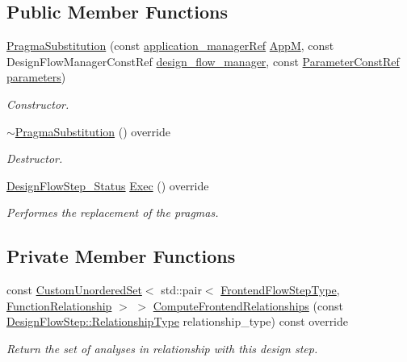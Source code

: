 \subsection*{Public Member Functions}
\begin{DoxyCompactItemize}
\item 
\hyperlink{classPragmaSubstitution_a6467e7276ca82574dfa5470900301f2d}{Pragma\+Substitution} (const \hyperlink{application__manager_8hpp_a04ccad4e5ee401e8934306672082c180}{application\+\_\+manager\+Ref} \hyperlink{classFrontendFlowStep_a0ac0d8db2a378416583f51c4faa59d15}{AppM}, const Design\+Flow\+Manager\+Const\+Ref \hyperlink{classDesignFlowStep_ab770677ddf087613add30024e16a5554}{design\+\_\+flow\+\_\+manager}, const \hyperlink{Parameter_8hpp_a37841774a6fcb479b597fdf8955eb4ea}{Parameter\+Const\+Ref} \hyperlink{classDesignFlowStep_a802eaafe8013df706370679d1a436949}{parameters})
\begin{DoxyCompactList}\small\item\em Constructor. \end{DoxyCompactList}\item 
\hyperlink{classPragmaSubstitution_a578b94c254c5b91a3c15f6b63ea42aed}{$\sim$\+Pragma\+Substitution} () override
\begin{DoxyCompactList}\small\item\em Destructor. \end{DoxyCompactList}\item 
\hyperlink{design__flow__step_8hpp_afb1f0d73069c26076b8d31dbc8ebecdf}{Design\+Flow\+Step\+\_\+\+Status} \hyperlink{classPragmaSubstitution_a77d4052228752a2ea2a3541f9340bce2}{Exec} () override
\begin{DoxyCompactList}\small\item\em Performes the replacement of the pragmas. \end{DoxyCompactList}\end{DoxyCompactItemize}
\subsection*{Private Member Functions}
\begin{DoxyCompactItemize}
\item 
const \hyperlink{classCustomUnorderedSet}{Custom\+Unordered\+Set}$<$ std\+::pair$<$ \hyperlink{frontend__flow__step_8hpp_afeb3716c693d2b2e4ed3e6d04c3b63bb}{Frontend\+Flow\+Step\+Type}, \hyperlink{classFrontendFlowStep_af7cf30f2023e5b99e637dc2058289ab0}{Function\+Relationship} $>$ $>$ \hyperlink{classPragmaSubstitution_a6a22136163ca0de01d924ab826fff0d4}{Compute\+Frontend\+Relationships} (const \hyperlink{classDesignFlowStep_a723a3baf19ff2ceb77bc13e099d0b1b7}{Design\+Flow\+Step\+::\+Relationship\+Type} relationship\+\_\+type) const override
\begin{DoxyCompactList}\small\item\em Return the set of analyses in relationship with this design step. \end{DoxyCompactList}\end{DoxyCompactItemize}
